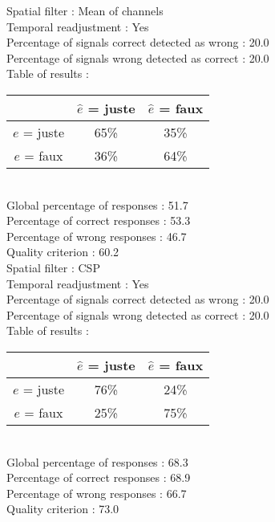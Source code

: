 Spatial filter : Mean of channels \\
Temporal readjustment : Yes \\
Percentage of signals correct detected as wrong :   20.0 \\
Percentage of signals wrong detected as correct :   20.0 \\
Table of results : \\
\begin{tabular}{|c|c|c|}
\hline				& $\hat{e}$ = juste & $\hat{e}$ = faux \\
\hline  $e$ = juste	&     65\%			&     35\%		\\
\hline  $e$ = faux	&     36\%			&     64\%		\\
\hline
\end{tabular}\\
Global percentage of responses :   51.7 \\
Percentage of correct responses :   53.3 \\
Percentage of wrong responses :   46.7 \\
Quality criterion :   60.2 \\

Spatial filter : CSP \\
Temporal readjustment : Yes \\
Percentage of signals correct detected as wrong :   20.0 \\
Percentage of signals wrong detected as correct :   20.0 \\
Table of results : \\
\begin{tabular}{|c|c|c|}
\hline				& $\hat{e}$ = juste & $\hat{e}$ = faux \\
\hline  $e$ = juste	&     76\%			&     24\%		\\
\hline  $e$ = faux	&     25\%			&     75\%		\\
\hline
\end{tabular}\\
Global percentage of responses :   68.3 \\
Percentage of correct responses :   68.9 \\
Percentage of wrong responses :   66.7 \\
Quality criterion :   73.0 \\


